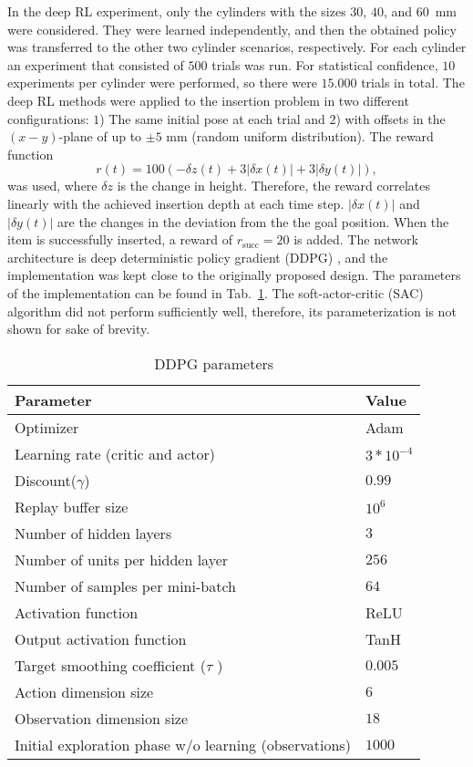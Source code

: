 In the deep RL experiment, only the cylinders with the sizes $30$, $40$, and $60$~mm were considered. They were learned independently, and then the obtained policy was transferred to the other two cylinder scenarios, respectively.
For each cylinder an experiment that consisted of $500$ trials was run.
For statistical confidence, $10$ experiments per cylinder were performed, so there were $15.000$ trials in total.
The deep RL methods were applied to the insertion problem in two different configurations: $1$) The same initial pose at each trial and $2$) with offsets in the $(x-y)$-plane of up to $\pm 5\text{ mm}$ (random uniform distribution).
The reward function
\begin{equation}
    r(t)=100(-\delta z(t)+3|\delta x(t)|+3|\delta y(t)|),
\end{equation}
was used, where $\delta z$ is the change in height.
Therefore, the reward correlates linearly with the achieved insertion depth at each time step.
$|\delta x(t)|$ and $|\delta y(t)|$ are the changes in the deviation from the the goal position.
When the item is successfully inserted, a reward of $r_\mathrm{succ}=20$ is added.
The network architecture is deep deterministic policy gradient (DDPG) \cite{Lillicrap.2015}, and the implementation was kept close to the originally proposed design.
The parameters of the implementation can be found in Tab.~\ref{tab:experiments:ddpg}.
The soft-actor-critic (SAC) algorithm did not perform sufficiently well, therefore, its parameterization is not shown for sake of brevity.

\begin{table}[ht!]
\begin{center}
\caption{DDPG parameters}\label{tab:experiments:ddpg}
\begin{tabular}{l|l}
 \hline
 Parameter & Value\\ 
  \hline
 Optimizer & Adam~\cite{Kingma.2014}   \\ 
 Learning rate (critic and actor)& $3*10^{-4}$  \\ 
 Discount($\gamma$) & $0.99$  \\ 
 Replay buffer size & $10^6$  \\ 
 Number of hidden layers & $3$  \\ 
 Number of units per hidden layer & $256$  \\ 
 Number of samples per mini-batch & $64$  \\ 
 Activation function & ReLU  \\ 
 Output activation function & TanH  \\ 

 Target smoothing coefficient ($\tau$ ) & $0.005$  \\ 
 \hline
 Action dimension size & $6$  \\ 
 Observation dimension size & $18$\\
 Initial exploration phase w/o learning (observations) & $1000$ \\
 \hline
\end{tabular}
\end{center}
\end{table}

